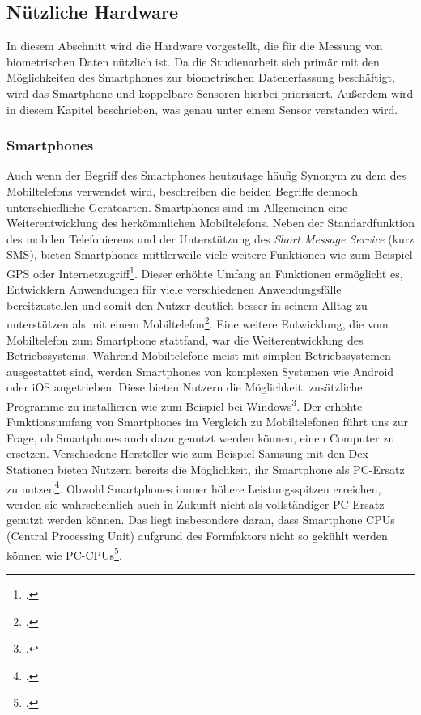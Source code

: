 \subsection{Nützliche Hardware}
In diesem Abschnitt wird die Hardware vorgestellt, die für die Messung von biometrischen Daten nützlich ist. Da die Studienarbeit sich primär mit den Möglichkeiten des Smartphones zur biometrischen Datenerfassung beschäftigt, wird das Smartphone und koppelbare Sensoren hierbei priorisiert. Außerdem wird in diesem Kapitel beschrieben, was genau unter einem Sensor verstanden wird.
\subsubsection{Smartphones}
Auch wenn der Begriff des Smartphones heutzutage häufig Synonym zu dem des Mobiltelefons verwendet wird, beschreiben die beiden Begriffe dennoch unterschiedliche Gerätearten. Smartphones sind im Allgemeinen eine Weiterentwicklung des herkömmlichen Mobiltelefons. Neben der Standardfunktion des mobilen Telefonierens und der Unterstützung des \textit{Short Message Service} (kurz SMS), bieten Smartphones mittlerweile viele weitere Funktionen wie zum Beispiel GPS oder Internetzugriff\footcite[Vgl. ][S.3 Z.5ff]{Bou11}.\newline
Dieser erhöhte Umfang an Funktionen ermöglicht es, Entwicklern Anwendungen für viele verschiedenen Anwendungsfälle bereitzustellen und somit den Nutzer deutlich besser in seinem Alltag zu unterstützen als mit einem Mobiltelefon\footcite[Vgl. ][Smartphones are tiny Computers]{Ada18}. Eine weitere Entwicklung, die vom Mobiltelefon zum Smartphone stattfand, war die Weiterentwicklung des Betriebssystems. Während Mobiltelefone meist mit simplen Betriebssystemen ausgestattet sind, werden Smartphones von komplexen Systemen wie Android oder iOS angetrieben. Diese bieten Nutzern die Möglichkeit, zusätzliche Programme zu installieren wie zum Beispiel bei Windows\footcite[Vgl. ][Mobile Operating Systems]{Ada18}.\newline
Der erhöhte Funktionsumfang von Smartphones im Vergleich zu Mobiltelefonen führt uns zur Frage, ob Smartphones auch dazu genutzt werden können, einen Computer zu ersetzen. Verschiedene Hersteller wie zum Beispiel Samsung mit den Dex-Stationen bieten Nutzern bereits die Möglichkeit, ihr Smartphone als PC-Ersatz zu nutzen\footcite{Kai18}. Obwohl Smartphones immer höhere Leistungsspitzen erreichen, werden sie wahrscheinlich auch in Zukunft nicht als vollständiger PC-Ersatz genutzt werden können. Das liegt insbesondere daran, dass Smartphone CPUs (Central Processing Unit) aufgrund des Formfaktors nicht so gekühlt werden können wie PC-CPUs\footcite[Vgl. ][Power and Heat]{Gav18}.\newline 
